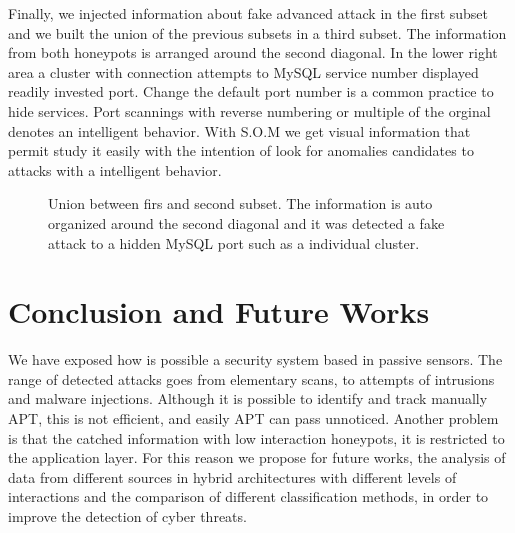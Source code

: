 \documentclass[a4paper]{llncs}
\begin{document}
Finally, we injected information about fake advanced attack in the first subset and we built the union of the previous subsets in a third subset. The information from both honeypots is arranged around the second diagonal. In the lower right area a cluster with connection attempts to MySQL service number displayed readily invested port. Change the default port number is a common practice to hide services. Port scannings with reverse numbering or multiple of the orginal denotes an intelligent behavior. With S.O.M we get visual information that permit study it easily with the intention of look for  anomalies candidates to attacks with a intelligent behavior.

\begin{figure}[h]
	\label{fig:internalTypes}
	\caption{Union between firs and second subset. The information is auto organized around the second diagonal and it was detected a fake attack to a hidden MySQL port such as a individual cluster.}
\end{figure}

\section{Conclusion and Future Works}
\label{sec:conclusion&future}
We have exposed how is possible a security system based in passive sensors. The range of detected attacks goes from elementary scans, to attempts of intrusions and malware injections. Although it is possible to identify and track manually APT, this is not efficient, and easily APT can pass unnoticed. Another problem is that the catched information with low interaction honeypots, it is restricted to the application layer. For this reason we propose for future works, the analysis of data from different sources in hybrid architectures with different levels of interactions and the comparison of different classification methods, in order to improve the detection of cyber threats.



\end{document}
